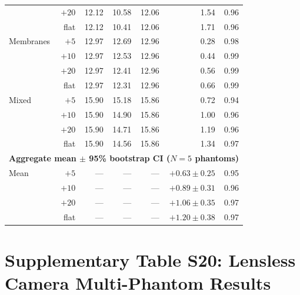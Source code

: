 \documentclass[11pt]{article}
\begin{document}
\begin{table}[htbp]
\begin{tabular}{l r r r r r r}
             & $+20$   & 12.12 & 10.58 & 12.06 & 1.54 & 0.96 \\
             & flat    & 12.12 & 10.41 & 12.06 & 1.71 & 0.96 \\
Membranes    & $+5$    & 12.97 & 12.69 & 12.96 & 0.28 & 0.98 \\
             & $+10$   & 12.97 & 12.53 & 12.96 & 0.44 & 0.99 \\
             & $+20$   & 12.97 & 12.41 & 12.96 & 0.56 & 0.99 \\
             & flat    & 12.97 & 12.31 & 12.96 & 0.66 & 0.99 \\
Mixed        & $+5$    & 15.90 & 15.18 & 15.86 & 0.72 & 0.94 \\
             & $+10$   & 15.90 & 14.90 & 15.86 & 1.00 & 0.96 \\
             & $+20$   & 15.90 & 14.71 & 15.86 & 1.19 & 0.96 \\
             & flat    & 15.90 & 14.56 & 15.86 & 1.34 & 0.97 \\
\midrule
\multicolumn{7}{l}{\textbf{Aggregate mean $\pm$ 95\% bootstrap CI ($N{=}5$ phantoms)}} \\
\midrule
Mean & $+5$    & --- & --- & --- & $+0.63 \pm 0.25$ & 0.95 \\
     & $+10$   & --- & --- & --- & $+0.89 \pm 0.31$ & 0.96 \\
     & $+20$   & --- & --- & --- & $+1.06 \pm 0.35$ & 0.97 \\
     & flat    & --- & --- & --- & $+1.20 \pm 0.38$ & 0.97 \\
\bottomrule
\end{tabular}
\end{table}


\section{Supplementary Table S20: Lensless Camera Multi-Phantom Results}
\label{sec:lensless_scenes}
\end{document}
